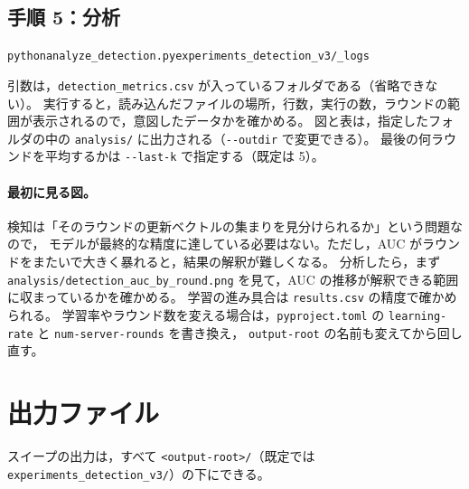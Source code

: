 \documentclass[a4j, dvipdfmx]{jsarticle}  %
\newenvironment{cmd}{\par\vspace{0.3em}\begin{alltt}\small}{\end{alltt}\vspace{0.3em}\par}
\begin{document}
\subsection{手順 5：分析}

\begin{cmd}
python analyze_detection.py experiments_detection_v3/_logs
\end{cmd}

引数は，\texttt{detection\_metrics.csv} が入っているフォルダである（省略できない）。
実行すると，読み込んだファイルの場所，行数，実行の数，ラウンドの範囲が表示されるので，意図したデータかを確かめる。
図と表は，指定したフォルダの中の \texttt{analysis/} に出力される（\texttt{-{}-outdir} で変更できる）。
最後の何ラウンドを平均するかは \texttt{-{}-last-k} で指定する（既定は 5）。

\paragraph{最初に見る図。}
検知は「そのラウンドの更新ベクトルの集まりを見分けられるか」という問題なので，
モデルが最終的な精度に達している必要はない。ただし，AUC がラウンドをまたいで大きく暴れると，結果の解釈が難しくなる。
分析したら，まず \texttt{analysis/detection\_auc\_by\_round.png} を見て，AUC の推移が解釈できる範囲に収まっているかを確かめる。
学習の進み具合は \texttt{results.csv} の精度で確かめられる。
学習率やラウンド数を変える場合は，\texttt{pyproject.toml} の \texttt{learning-rate} と \texttt{num-server-rounds} を書き換え，
\texttt{output-root} の名前も変えてから回し直す。

\section{出力ファイル}
\label{sec:output}

スイープの出力は，すべて \texttt{<output-root>/}（既定では \texttt{experiments\_detection\_v3/}）の下にできる。
\end{document}
